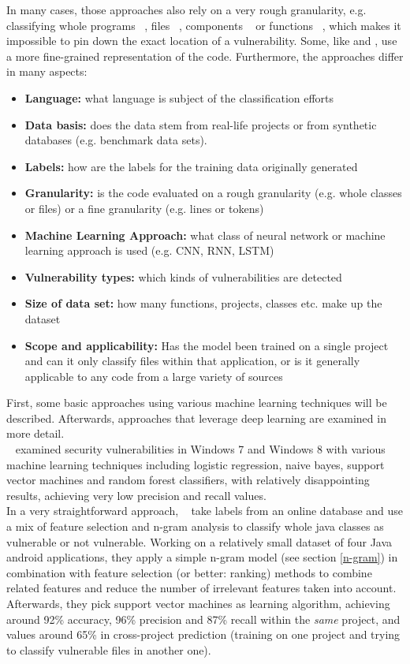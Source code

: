 \documentclass[
a4paper,
pagesize,
pdftex,
12pt,
twoside, %
BCOR=5mm, %
ngerman,
fleqn,
final,
]{scrartcl}
\begin{document}
	In many cases, those approaches also rely on a very rough granularity, e.g. classifying whole programs ~\cite{Grieco.2016}, files ~\cite{Shin.2010}, components ~\cite{Neuhaus.2007} or functions ~\cite{Yamaguchi.2011}, which makes it impossible to pin down the exact location of a vulnerability. Some, like \cite{Li.2018} and \cite{Russell.2018}, use a more fine-grained representation of the code. Furthermore, the approaches differ in many aspects:
	\begin{itemize}
		\item \textbf{Language:} what language is subject of the classification efforts
		\item \textbf{Data basis:} does the data stem from real-life projects or from synthetic databases (e.g. benchmark data sets).
		\item \textbf{Labels:} how are the labels for the training data originally generated
		\item \textbf{Granularity:} is the code evaluated on a rough granularity (e.g. whole classes or files) or a fine granularity (e.g. lines or tokens)
		\item \textbf{Machine Learning Approach:} what class of neural network or machine learning approach is used (e.g. CNN, RNN, LSTM)
		\item \textbf{Vulnerability types:} which kinds of vulnerabilities are detected
		\item \textbf{Size of data set:} how many functions, projects, classes etc. make up the dataset
		\item \textbf{Scope and applicability:} Has the model been trained on a single project and can it only classify files within that application, or is it generally applicable to any code from a large variety of sources
	\end{itemize}
	First, some basic approaches using various machine learning techniques will be described. Afterwards, approaches that leverage deep learning are examined in more detail.\\
	~\cite{Morrison.2015} examined security vulnerabilities in Windows 7 and Windows 8 with various machine learning techniques including logistic regression, naive bayes, support vector machines and random forest classifiers, with relatively disappointing results, achieving very low precision and recall values.\\
	In a very straightforward approach, ~\cite{Pang.2015} take labels from an online database and use a mix of feature selection and n-gram analysis to classify whole java classes as vulnerable or not vulnerable. Working on a relatively small dataset of four Java android applications, they apply a simple n-gram model (see section \ref{n-gram}) in combination with feature selection (or better: ranking) methods to combine related features and reduce the number of irrelevant features taken into account. Afterwards, they pick support vector machines as learning algorithm, achieving around 92\% accuracy, 96\% precision and 87\% recall within the \textit{same} project, and values around 65\% in cross-project prediction (training on one project and trying to classify vulnerable files in another one).\\
\end{document}

